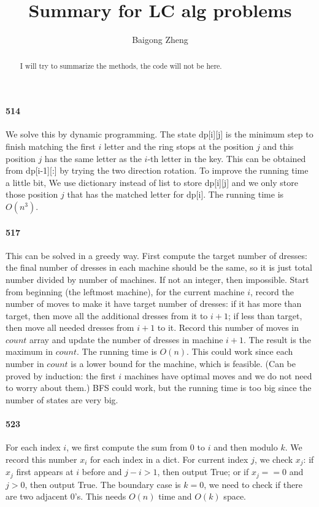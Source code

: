 \documentclass[11pt]{article}
\begin{document}
\title{
{Summary for LC alg problems}
}
\author{Baigong Zheng}
\date{}
\maketitle
\begin{abstract}
I will try to summarize the methods, the code will not be here.
\end{abstract}

\paragraph{514}
We solve this by dynamic programming.
The state dp[i][j] is the minimum step to finish matching the first $i$ letter and the ring stops at the position $j$ and 
this position $j$ has the same letter as the $i$-th letter in the key. This can be obtained from dp[i-1][:] by trying the 
two direction rotation. To improve the running time a little bit, We use dictionary instead of list to store dp[i][j] and
we only store those position $j$ that has the matched letter for dp[i].
The running time is $O(n^3)$.

\paragraph{517}
This can be solved in a greedy way. 
First compute the target number of dresses: the final number of dresses in each machine should be the same, so it is just total number divided by number of machines. If not an integer, then impossible.
Start from beginning (the leftmost machine), for the current machine $i$, record the number of moves to make it have target number of dresses: if it has more than target, then move all the additional dresses from it to $i+1$; if less than target, then move all needed dresses from $i+1$ to it. 
Record this number of moves in $count$ array and update the number of dresses in machine $i+1$.
The result is the maximum in $count$.
The running time is $O(n)$.
This could work since each number in $count$ is a lower bound for the machine, which is feasible. (Can be proved by induction: the first $i$ machines have optimal moves and we do not need to worry about them.)
BFS could work, but the running time is too big since the number of states are very big.

\paragraph{523}
For each index $i$, we first compute the sum from 0 to $i$ and then modulo $k$. We record this number $x_i$ for each index in a dict.
For current index $j$, we check $x_j$: if $x_j$ first appears at $i$ before and $j - i > 1$, then output True; or if $x_j == 0$ and $j > 0$, then output True.
The boundary case is $k = 0$, we need to check if there are two adjacent 0's.
This needs $O(n)$ time and $O(k)$ space.
 
\end{document}
